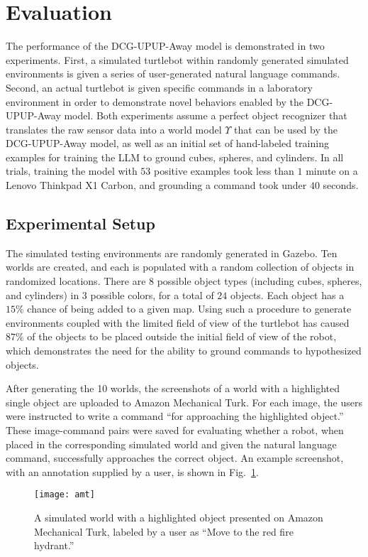\section{Evaluation}
\label{sec:evaluation}
The performance of the DCG-UPUP-Away model is demonstrated in two experiments.
First, a simulated turtlebot within randomly generated simulated environments is given a series of user-generated natural language commands.
Second, an actual turtlebot is given specific commands in a laboratory environment in order to demonstrate novel behaviors enabled by the DCG-UPUP-Away model.
Both experiments assume a perfect object recognizer that translates the raw sensor data into a world model $\Upsilon$ that can be used by the DCG-UPUP-Away model, as well as an initial set of hand-labeled training examples for training the LLM to ground cubes, spheres, and cylinders.
In all trials, training the model with $53$ positive examples took less than $1$ minute on a Lenovo Thinkpad X1 Carbon, and grounding a command took under $40$ seconds.
\subsection{Experimental Setup}
The simulated testing environments are randomly generated in Gazebo.
Ten worlds are created, and each is populated with a random collection of objects in randomized locations.
There are $8$ possible object types (including cubes, spheres, and cylinders) in $3$ possible colors, for a total of $24$ objects.
Each object has a $15\%$ chance of being added to a given map.
Using such a procedure to generate environments coupled with the limited field of view of the turtlebot has caused $87\%$ of the objects to be placed outside the initial field of view of the robot, which demonstrates the need for the ability to ground commands to hypothesized objects.

After generating the 10 worlds, the screenshots of a world with a highlighted single object are uploaded to Amazon Mechanical Turk. For each image, the users were instructed to write a command ``for approaching the highlighted object.''
These image-command pairs were saved for evaluating whether a robot, when placed in the corresponding simulated world and given the natural language command, successfully approaches the correct object.
An example screenshot, with an annotation supplied by a user, is shown in Fig.~\ref{fig:amt}.
\begin{figure}[h]
	\centering
    \texttt{[image: amt]}
	\caption{A simulated world with a highlighted object presented on Amazon Mechanical Turk, labeled by a user as ``Move to the red fire hydrant.''}
	\label{fig:amt}
\end{figure}


